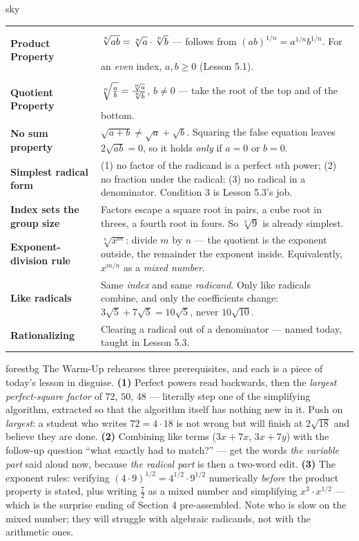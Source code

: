 \documentclass[10pt]{article}
\newcommand{\TallMath}[1]{$\displaystyle #1\rule[-1.4em]{0pt}{3.2em}$}
\begin{document}
\begin{skillbox}{sky}
\renewcommand{\arraystretch}{1.3}
\begin{tabularx}{\linewidth}{@{}l X@{}}
\textbf{Product Property} & \TallMath{\sqrt[n]{ab}=\sqrt[n]{a}\cdot\sqrt[n]{b}} --- follows from $(ab)^{1/n}=a^{1/n}b^{1/n}$. For an \emph{even} index, $a,b\ge0$ (Lesson 5.1). \\
\textbf{Quotient Property} & \TallMath{\sqrt[n]{\tfrac{a}{b}}=\tfrac{\sqrt[n]{a}}{\sqrt[n]{b}}}, $b\ne0$ --- take the root of the top and of the bottom. \\
\textbf{No sum property} & $\sqrt{a+b}\ne\sqrt{a}+\sqrt{b}$. Squaring the false equation leaves $2\sqrt{ab}=0$, so it holds \emph{only} if $a=0$ or $b=0$. \\
\textbf{Simplest radical form} & (1) no factor of the radicand is a perfect $n$th power; (2) no fraction under the radical; (3) no radical in a denominator. Condition 3 is Lesson 5.3's job. \\
\textbf{Index sets the group size} & Factors escape a square root in pairs, a cube root in threes, a fourth root in fours. So $\sqrt[3]{9}$ is already simplest. \\
\textbf{Exponent-division rule} & $\sqrt[n]{x^{m}}$: divide $m$ by $n$ --- the quotient is the exponent outside, the remainder the exponent inside. Equivalently, $x^{m/n}$ as a \emph{mixed number}. \\
\textbf{Like radicals} & Same \emph{index} and same \emph{radicand}. Only like radicals combine, and only the coefficients change: $3\sqrt5+7\sqrt5=10\sqrt5$, never $10\sqrt{10}$. \\
\textbf{Rationalizing} & Clearing a radical out of a denominator --- named today, taught in Lesson 5.3. \\
\end{tabularx}
\end{skillbox}

\begin{fixedskillbox}{forestbg}
    The Warm-Up rehearses three prerequisites, and each is a piece of today's lesson in disguise.
    \textbf{(1)} Perfect powers read backwards, then the \emph{largest perfect-square factor} of
    $72$, $50$, $48$ --- literally step one of the simplifying algorithm, extracted so that the
    algorithm itself has nothing new in it. Push on \emph{largest}: a student who writes
    $72=4\cdot18$ is not wrong but will finish at $2\sqrt{18}$ and believe they are done.
    \textbf{(2)} Combining like terms ($3x+7x$, $3x+7y$) with the follow-up question ``what exactly
    had to match?'' --- get the words \emph{the variable part} said aloud now, because
    \emph{the radical part} is then a two-word edit. \textbf{(3)} The exponent rules: verifying
    $(4\cdot9)^{1/2}=4^{1/2}\cdot9^{1/2}$ numerically \emph{before} the product property is stated,
    plus writing $\frac72$ as a mixed number and simplifying $x^{3}\cdot x^{1/2}$ --- which is the
    surprise ending of Section 4 pre-assembled. Note who is slow on the mixed number; they will
    struggle with algebraic radicands, not with the arithmetic ones.
\end{fixedskillbox}
\end{document}
